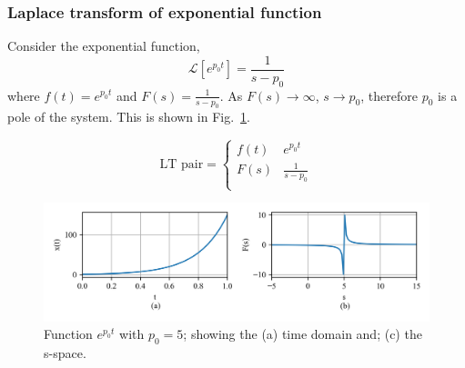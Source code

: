 \documentclass[12pt,letter]{article}
\numberwithin{ex}{section} %
\numberwithin{re}{section} %
\newcommand{\Laplace}[1]{\ensuremath{\mathcal{L}{\left[#1\right]}}}
\numberwithin{equation}{section}	%
\begin{document}
		\subsubsection{Laplace transform of exponential function}

		Consider the exponential function,
		\begin{equation}
		\Laplace{e^{p_0t}} = \frac{1}{s -p_0} 
		\end{equation}
		where
		$f(t) = e^{p_0t}$ and $F(s) = \frac{1}{s -p_0} $. As $F(s) \rightarrow \infty $, $s \rightarrow p_0$, therefore $p_0$ is a pole of the system. This is shown in Fig.~\ref{fig:S_space_exp_pt}.	

		\begin{equation}
		\text{LT pair} =
			\begin{cases}
			f(t) & e^{p_0t} \\
			F(s) & \frac{1}{s -p_0} \\
			\end{cases}
		\end{equation}

	
		\begin{figure}[H]
			\centering
			\includegraphics[width=6.5in]{../figures/T_and_S_space_exponential_function.png}
			\caption{Function $e^{p_0t}$ with $p_0=5$; showing the (a) time domain and; (c) the s-space.}
			\label{fig:S_space_exp_pt}
		\end{figure}
\end{document}
